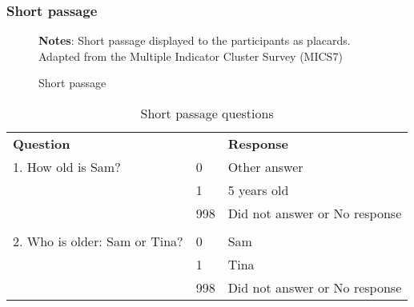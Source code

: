 \documentclass[hidelinks,12pt]{article}
\begin{document}
\subsubsection{Short passage}
\begin{figure}[H]
\centering
\caption{Short passage}\label{fig:lit_passage_s}
\footnotesize{\justify\textbf{Notes}: Short passage displayed to the participants as placards. Adapted from the Multiple Indicator Cluster Survey (MICS7)}
\end{figure}
\vspace{-12.5mm}
\begin{table}[H]
\begin{singlespace}
    \centering
    \fontsize{10pt}{9pt}\selectfont  %
    \caption{Short passage questions} \label{passage_s_questions}
    \begin{tabular}{@{}p{}p{}p{}@{}}
    \textbf{Question} & & \textbf{Response}\\
    1. How old is Sam?	 & 0 & Other answer \\
	& 1 &	5 years old \\
	& 998 &	Did not answer or No response \\
    & & \\
    2. Who is older: Sam or Tina?	& 0	& Sam \\
	& 1	& Tina \\
	& 998 &	Did not answer or No response \\
    \end{tabular}
\end{singlespace}
\end{table}
\end{document}
